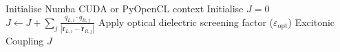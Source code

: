 \documentclass[journal=jpclcd, manuscript=letter, layout=twocolumn, doi=true]{achemso}
\begin{document}
\begin{algorithm*}[ht]
\begin{algorithmic}[1]
\vspace{0.2cm}
    \State Initialise Numba CUDA or PyOpenCL context
    \State Initialise $J = 0$ 
        \State $J \gets J + \sum_j \frac{q_{L,i} \cdot q_{R,j}}{|\mathbf{r}_{L,i} - \mathbf{r}_{R,j}|}$
    \EndFor
    \State Apply optical dielectric screening factor ($\varepsilon_{\mathrm{opt}}$)
    \State \Return Excitonic Coupling $J$
\EndProcedure
\end{algorithmic}
\end{algorithm*}
\end{document}
